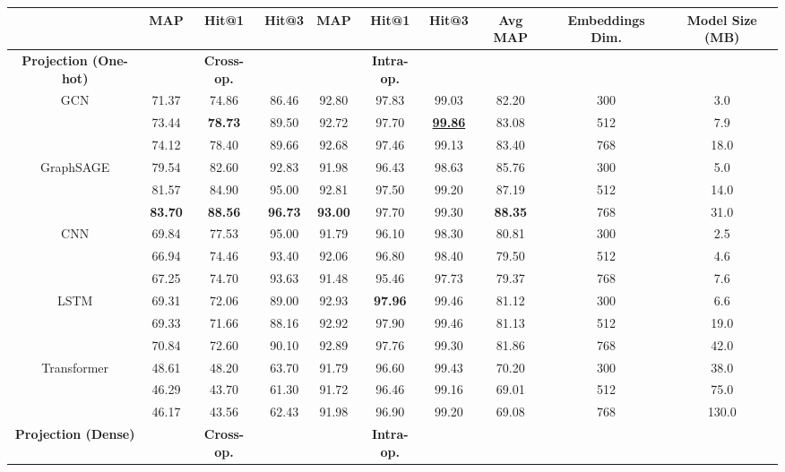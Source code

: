 \documentclass[11pt]{article}
\begin{document}
\begin{table}[th]
    \tiny
    \centering
    \begin{tabular}{c|ccc|ccc|c|cc}
        \toprule
         \textbf{}  & \textbf{MAP} & \textbf{Hit@1} & \textbf{Hit@3} & \textbf{MAP} & \textbf{Hit@1} & \textbf{Hit@3} & \textbf{Avg MAP} & \textbf{Embeddings Dim.} & \textbf{Model Size (MB)}\\ 
       \midrule
       \textbf{Projection (One-hot)} & & \textbf{Cross-op.} & & & \textbf{Intra-op.} & & &\\
       \midrule
       GCN & 71.37 & 74.86 & 86.46 & 92.80 & 97.83 & 99.03 & 82.20 & 300 & 3.0\\
        & 73.44 & \textbf{78.73} & 89.50 & 92.72 & 97.70 & \underline{\textbf{99.86}} & 83.08 & 512 & 7.9\\
       & 74.12 & 78.40 & 89.66 & 92.68 & 97.46 & 99.13 & 83.40 & 768 & 18.0\\
       GraphSAGE & 79.54 & 82.60 & 92.83 & 91.98 & 96.43 & 98.63 & 85.76 & 300 & 5.0\\
       & 81.57 & 84.90 & 95.00 & 92.81 & 97.50 & 99.20 & 87.19 & 512 & 14.0\\
       & \textbf{83.70} & \textbf{88.56} & \textbf{96.73} & \textbf{93.00} & 97.70 & 99.30 & \textbf{88.35} & 768 & 31.0\\
       \midrule
       CNN& 69.84 & 77.53 & 95.00 & 91.79 & 96.10 & 98.30 &  80.81 & 300 & 2.5\\
       & 66.94 & 74.46 & 93.40 & 92.06 & 96.80 & 98.40 & 79.50 & 512 & 4.6\\
       & 67.25 & 74.70 & 93.63 & 91.48 & 95.46 & 97.73 & 79.37 & 768 & 7.6\\
       LSTM & 69.31 & 72.06 & 89.00 & 92.93 & \textbf{97.96} & 99.46 & 81.12 & 300 & 6.6\\
       & 69.33 & 71.66 & 88.16 & 92.92 & 97.90 & 99.46 & 81.13 & 512 & 19.0\\
       & 70.84 & 72.60 & 90.10 & 92.89 & 97.76 & 99.30 & 81.86 & 768 & 42.0\\
       Transformer& 48.61 & 48.20 & 63.70 & 91.79 & 96.60 & 99.43 & 70.20 & 300 & 38.0\\
       & 46.29 & 43.70 & 61.30 & 91.72 & 96.46 & 99.16 & 69.01 & 512 & 75.0\\
       & 46.17 & 43.56 & 62.43 & 91.98 & 96.90 & 99.20 & 69.08 & 768 & 130.0\\
       \midrule
       \textbf{Projection (Dense)} & & \textbf{Cross-op.} & & & \textbf{Intra-op.} & & & \\

\end{tabular}
\end{table}
\end{document}
